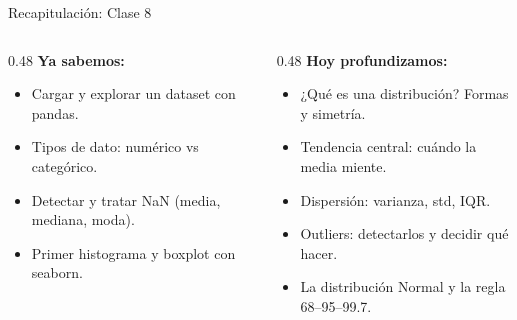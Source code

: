 \documentclass[aspectratio=169, 11pt]{beamer}
\begin{document}
\begin{frame}{Recapitulación: Clase 8}
  \vspace{-4pt}
  \begin{columns}[T]
    \begin{column}{0.48\textwidth}
      {\footnotesize\bfseries\color{arcaDark} Ya sabemos:}
      \vspace{4pt}

      {\footnotesize
      \begin{itemize}\setlength{\itemsep}{4pt}
        \item[{\color{codeGreen}\faCheckCircle}]
          Cargar y explorar un dataset con pandas.
        \item[{\color{codeGreen}\faCheckCircle}]
          Tipos de dato: numérico vs categórico.
        \item[{\color{codeGreen}\faCheckCircle}]
          Detectar y tratar NaN (media, mediana, moda).
        \item[{\color{codeGreen}\faCheckCircle}]
          Primer histograma y boxplot con seaborn.
      \end{itemize}
      }
    \end{column}

    \begin{column}{0.48\textwidth}
      {\footnotesize\bfseries\color{arcaRed} Hoy profundizamos:}
      \vspace{4pt}

      {\footnotesize
      \begin{itemize}\setlength{\itemsep}{4pt}
        \item[{\color{arcaRed}\faArrowRight}]
          ¿Qué es una distribución? Formas y simetría.
        \item[{\color{arcaRed}\faArrowRight}]
          Tendencia central: cuándo la media miente.
        \item[{\color{arcaRed}\faArrowRight}]
          Dispersión: varianza, std, IQR.
        \item[{\color{arcaRed}\faArrowRight}]
          Outliers: detectarlos y decidir qué hacer.
        \item[{\color{arcaRed}\faArrowRight}]
          La distribución Normal y la regla 68--95--99.7.
      \end{itemize}
      }
    \end{column}
  \end{columns}
\end{frame}
\end{document}
